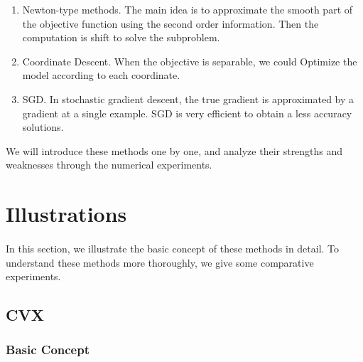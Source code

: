 \documentclass[
10pt, %
a4paper, %
oneside, %
headinclude,footinclude, %
BCOR5mm, %
]{scrartcl}
\begin{document}
\begin{enumerate}[noitemsep]
	\item Newton-type methods. The main idea is to approximate the smooth part 
of the objective function using the second order information. Then the 
computation is shift to solve the subproblem.
	

	\item Coordinate Descent. When the objective is separable, we could 
Optimize the model according to each coordinate.
	

	\item SGD. In stochastic gradient descent, the true gradient is approximated 
by a gradient at a single example. SGD is very efficient to obtain a less 
accuracy solutions. 
	

\end{enumerate}

We will introduce these methods one by one, and analyze their strengths and 
weaknesses through the numerical experiments.



\section{Illustrations}
\paragraph{}
In this section, we illustrate the basic concept of these methods in detail.
To understand these methods more thoroughly, we give some comparative 
experiments.




\subsection{CVX}
\subsubsection{Basic Concept}
\end{document}
